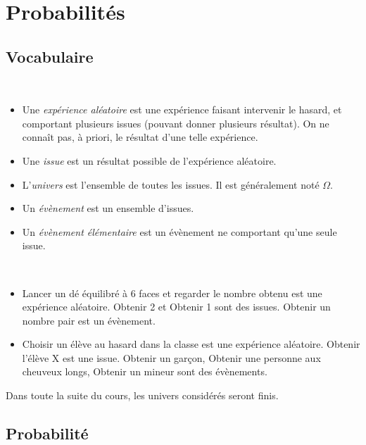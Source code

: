 \chapter{Probabilités}
\section{Vocabulaire}

\begin{definition}~
  \begin{itemize}
    \item Une \emph{expérience aléatoire} est une expérience faisant intervenir le hasard, et comportant plusieurs issues (pouvant donner plusieurs résultat). On ne connaît pas, à priori, le résultat d'une telle expérience.
    \item Une \emph{issue} est un résultat possible de l'expérience aléatoire.
    \item L'\emph{univers} est l'ensemble de toutes les issues. Il est généralement noté $\Omega$.
    \item Un \emph{évènement} est un ensemble d'issues.
    \item Un \emph{évènement élémentaire} est un évènement ne comportant qu'une seule issue.
  \end{itemize}
\end{definition}

\begin{exemple}~
  \begin{itemize}
    \item Lancer un dé équilibré à 6 faces et regarder le nombre obtenu est une expérience aléatoire. \og{}Obtenir 2\fg{} et \og{}Obtenir 1\fg{} sont des issues. \og{}Obtenir un nombre pair\fg{} est un évènement.
    \item Choisir un élève au hasard dans la classe est une expérience aléatoire. \og{}Obtenir l'élève X\fg{} est une issue. \og{}Obtenir un garçon\fg{}, \og{}Obtenir une personne aux cheuveux longs\fg{}, \og{}Obtenir un mineur\fg{} sont des évènements.
  \end{itemize}
\end{exemple}

\begin{remarque}
  Dans toute la suite du cours, les univers considérés seront finis.
\end{remarque}

\section{Probabilité}

